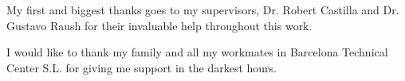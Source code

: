 \documentclass[
12pt, %
english, %
singlespacing, %
parskip, %
headsepline, %
consistentlayout, %
]{MastersDoctoralThesis} %
\begin{document}

\begin{acknowledgements}
\addchaptertocentry{\acknowledgementname} %
My first and biggest thanks goes to my supervisors, Dr. Robert Castilla and Dr. Gustavo Raush for their invaluable help throughout this work. 

\noindent I would like to thank my family and all my workmates in Barcelona Technical Center S.L. for giving me support in the darkest hours.
\end{acknowledgements}


\tableofcontents  %

\listoffigures %

\listoftables %




\mainmatter %

\pagestyle{thesis} %



 

 
 
 

\printbibliography[heading=bibintoc]

\appendix %




%


\end{document}
